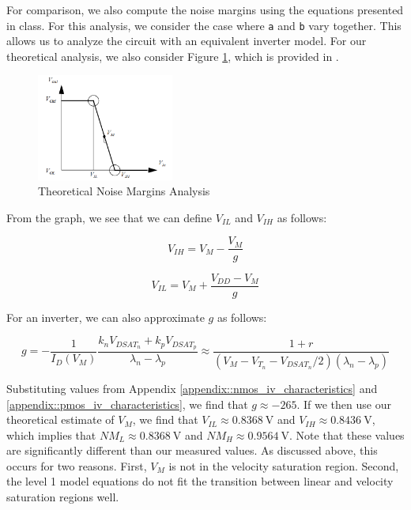 \documentclass[fleqn]{article}
\begin{document}
	For comparison, we also compute the noise margins using the equations presented in class. For this analysis, we consider the case where \texttt{a} and \texttt{b} vary together. This allows us to analyze the circuit with an equivalent inverter model. For our theoretical analysis, we also consider Figure \ref{fig::noise_margins_theory}, which is provided in \cite{rabaey_2003_digital}.
	
	\begin{figure}[H]
		\centerline{\includegraphics[width=0.4\textwidth]{noise_margins_theory.png}}
		\caption{Theoretical Noise Margins Analysis}
		\label{fig::noise_margins_theory}
	\end{figure}
	
	\noindent From the graph, we see that we can define $V_{IL}$ and $V_{IH}$ as follows:
	
	\begin{equation}
		\label{eq::vih_theory}
		V_{IH} = V_{M} - \frac{V_M}{g}
	\end{equation}
	
	\begin{equation}
		\label{eq::vil_theory}
		V_{IL} = V_{M} + \frac{V_{DD} - V_M}{g}
	\end{equation}
	
	\noindent For an inverter, we can also approximate $g$ as follows:
	
	\begin{equation}
		\label{eq::g_theory}
		g = -\frac{1}{I_D(V_M)}\frac{k_nV_{DSAT_n} + k_pV_{DSAT_p}}{\lambda_n - \lambda_p} \approx \frac{1 + r}{(V_M - V_{T_n} - V_{DSAT_n}/2)(\lambda_n - \lambda_p)}
	\end{equation}
	
	\noindent Substituting values from Appendix \ref{appendix::nmos_iv_characteristics} and \ref{appendix::pmos_iv_characteristics}, we find that $g \approx -265$. If we then use our theoretical estimate of $V_{M}$, we find that $V_{IL} \approx 0.8368\ \text{V}$ and $V_{IH} \approx 0.8436\ \text{V}$, which implies that $NM_L \approx 0.8368\ \text{V}$ and $NM_H \approx 0.9564\ \text{V}$. Note that these values are significantly different than our measured values. As discussed above, this occurs for two reasons. First, $V_M$ is not in the velocity saturation region. Second, the level 1 model equations do not fit the transition between linear and velocity saturation regions well.
	
\end{document}
